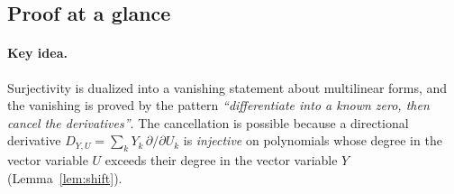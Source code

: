 \documentclass[11pt]{article}
\theoremstyle{remark}
\newcommand{\D}[2]{D_{#1,#2}}
\begin{document}
\subsection{Proof at a glance}\label{sec:glance}

\paragraph{Key idea.}
Surjectivity is dualized into a vanishing statement about multilinear
forms, and the vanishing is proved by the pattern
\emph{``differentiate into a known zero, then cancel the derivatives''}.
The cancellation is possible because a directional derivative
$\D{Y}{U}=\sum_kY_k\,\partial/\partial U_k$ is \emph{injective} on
polynomials whose degree in the vector variable $U$ exceeds their degree in
the vector variable $Y$ (Lemma~\ref{lem:shift}).
\end{document}
